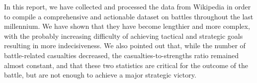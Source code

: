 In this report, we have collected and processed the data from Wikipedia in order to compile a comprehensive and actionable dataset on battles throughout the last millennium. We have shown that they have become lengthier and more complex, with the probably increasing difficulty of achieving tactical and strategic goals resulting in more indecisiveness. We also pointed out that, while the number of battle-related casualties decreased, the casualties-to-strengths ratio remained almost constant, and that these two statistics are critical for the outcome of the battle, but are not enough to achieve a major strategic victory.
